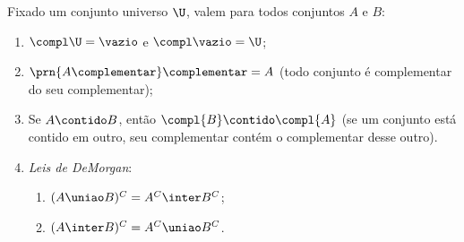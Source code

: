 \begin{proposition}
	\label{prop:complementar}
	Fixado um conjunto universo $\U$, valem para todos conjuntos $A$ e $B$:
	\begin{enumerate}
		\item
			\label{prop:complementar:universo}
			$\compl\U = \vazio$ e $\compl\vazio = \U$;
		\item
			\label{prop:complementar:complementar-do-complementar}
			$\prn{A\complementar}\complementar = A$ (todo conjunto é complementar do seu complementar);
		\item
			\label{prop:complementar:contrapositiva}
			Se $A \contido B$, então $\compl{B} \contido \compl{A}$ (se um conjunto está contido em outro, seu complementar contém o complementar desse outro).
			
		\item
			\label{prop:demorgan}
			\emph{Leis de DeMorgan}:
			\begin{enumerate}
				\item $(A \uniao B)^C = A^C \inter B^C$;
				\item $(A \inter B)^C = A^C \uniao B^C$.
			\end{enumerate} 
	\end{enumerate}
\end{proposition}

